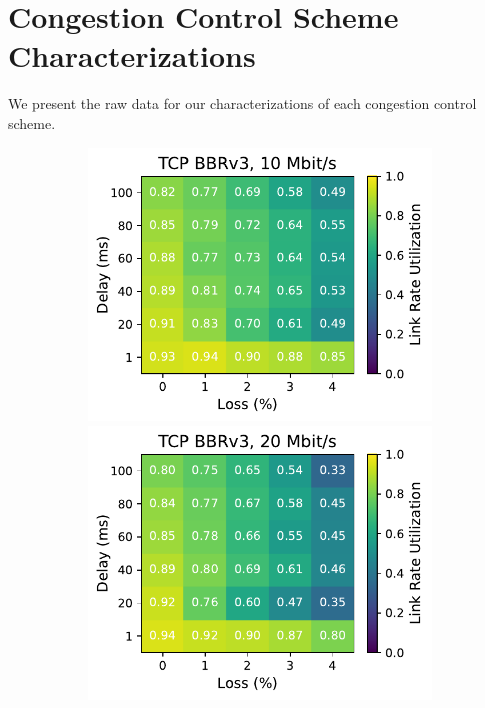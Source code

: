 \section{Congestion Control Scheme Characterizations}
\label{sec:appendix:heatmaps}

We present the raw data for our characterizations of each
congestion control scheme.

\begin{figure}[ht]
    \centering
    \begin{subfigure}[b]{0.22\linewidth}
        \includegraphics[width=\linewidth,trim={0 0 2cm 0},clip]{splitting-paper/figures/heatmaps/heatmap_tcp_bbr3_10mbps.pdf}
        \includegraphics[width=\linewidth,trim={0 0 2cm 0},clip]{splitting-paper/figures/heatmaps/heatmap_tcp_bbr3_20mbps.pdf}

\end{subfigure}
\end{figure}
